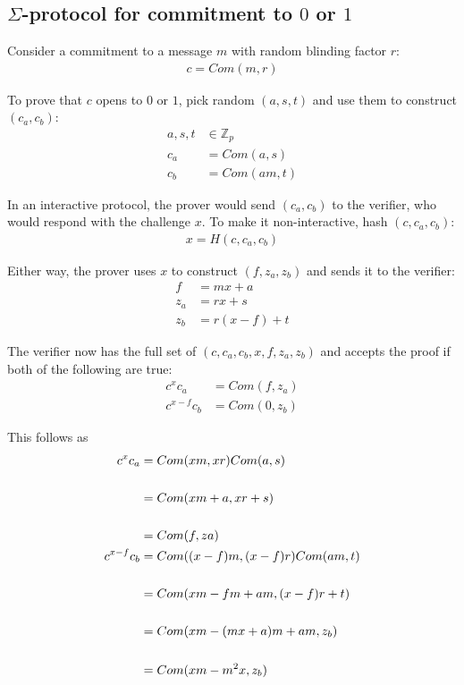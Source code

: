 \documentclass{article}
\begin{document}
\subsection{$\Sigma$-protocol for commitment to $0$ or $1$}

Consider a commitment to a message $m$ with random blinding factor $r$:
\begin{align}
  c=Com(m, r)
\end{align}

To prove that $c$ opens to $0$ or $1$, pick random $(a,s,t)$ and use them to construct $(c_a, c_b)$:
\begin{align}
  a,s,t &\in \mathbb{Z}_p\\
  c_a &= Com(a, s)\\
  c_b &= Com(am, t)
\end{align}

In an interactive protocol, the prover would send $(c_a,c_b)$ to the verifier, who would respond with the challenge $x$.  To make it non-interactive, hash $(c, c_a, c_b)$:
\begin{align}
  x = H(c, c_a, c_b)
\end{align}

Either way, the prover uses $x$ to construct $(f, z_a, z_b)$ and sends it to the verifier:
\begin{align}
  f &= mx + a\\
  z_a &= rx + s\\
  z_b &= r(x-f) + t
\end{align}

The verifier now has the full set of $(c, c_a, c_b, x, f, z_a, z_b)$ and accepts the proof if both of the following are true:
\begin{align}
  c^x c_a &= Com(f, z_a)\\
  c^{x-f} c_b &= Com(0, z_b)
\end{align}

This follows as 
\begin{align}
  c^x c_a &= Com(xm,xr) Com(a,s)\\
  \cr &= Com(xm+a, xr+s)\\
  \cr &= Com(f, za)\\
  c^{x-f} c_b &= Com((x-f)m, (x-f)r) Com(am, t)\\
  \cr &= Com(xm - fm + am, (x-f)r + t)\\
  \cr &= Com(xm - (mx + a)m + am, z_b)\\
  \cr &= Com(xm - m^2 x, z_b)
\end{align}
\end{document}
